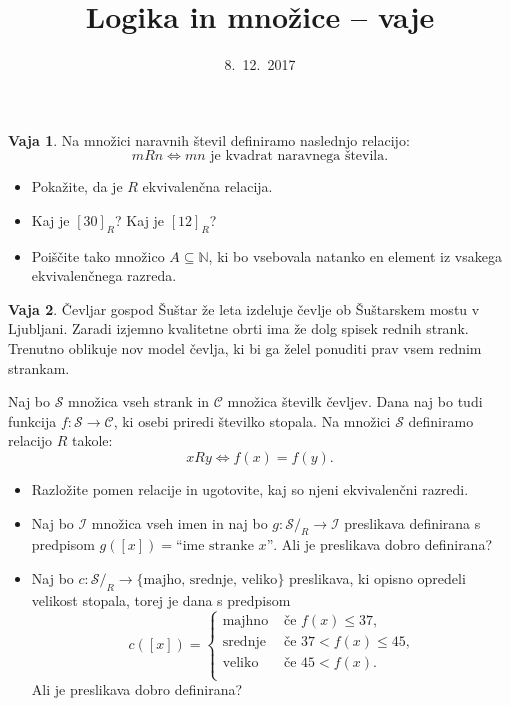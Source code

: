 \documentclass{article}
\newcommand{\NN}{\mathbb{N}}
\theoremstyle{definition}
\newtheorem{vaja}{Vaja}
\begin{document}
\title{Logika in množice -- vaje}
\date{8.~12.~2017}
\maketitle


\begin{vaja}
	Na množici naravnih števil definiramo naslednjo relacijo:
	\[m R n \iff \text{$m n$ je kvadrat naravnega števila}.\]
	\begin{itemize}
		\item
		Pokažite, da je $R$ ekvivalenčna relacija.
		\item
		Kaj je $[30]_R$? Kaj je $[12]_R$?
		\item
		Poiščite tako množico $A \subseteq \NN$, ki bo vsebovala natanko en element iz vsakega ekvivalenčnega razreda.
	\end{itemize}
\end{vaja}

\begin{vaja}
	Čevljar gospod Šuštar že leta izdeluje čevlje ob Šuštarskem mostu v Ljubljani. Zaradi izjemno kvalitetne obrti ima že dolg spisek rednih strank. Trenutno oblikuje nov model čevlja, ki bi ga želel ponuditi prav vsem rednim strankam.
	
  Naj bo $\mathcal{S}$ množica vseh strank in $\mathcal{C}$ množica številk čevljev. Dana naj bo tudi funkcija $f\colon \mathcal{S} \to \mathcal{C}$, ki osebi priredi številko stopala. Na množici $\mathcal{S}$ definiramo relacijo $R$ takole:
  \begin{equation*}
    x R y \iff f(x) = f(y).
  \end{equation*}
  \begin{itemize}
  	\item  Razložite pomen relacije in ugotovite, kaj so njeni ekvivalenčni razredi.
  	\item Naj bo $\mathcal{I}$ množica vseh imen in naj bo $g \colon \mathcal{S} / _R \to \mathcal{I} $ preslikava definirana s predpisom $g([x]) = \text{“ime stranke $x$”}$. Ali je preslikava dobro definirana?
  	\item Naj bo $c \colon \mathcal{S} / _R \to \{\text{majho, srednje, veliko}\}$ preslikava, ki opisno opredeli velikost stopala, torej je dana s predpisom
  	\begin{equation*}
  	c([x]) = 
  	\begin{cases}
  	\text{majhno} & \text{ če $f(x) \leq 37$,} \\
  	\text{srednje} & \text{ če $37 < f(x) \leq 45$,} \\
  	\text{veliko} & \text{ če $45 < f(x)$.} \\
  	\end{cases}
  	\end{equation*}
  	Ali je preslikava dobro definirana?
  \end{itemize}
\end{vaja}
\end{document}
